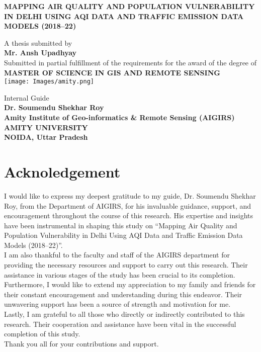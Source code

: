 \documentclass[12pt]{report}
\begin{document}
\begin{titlepage}
    \doublespacing
    \centering
    \vspace*{2cm}
    \large
    \textbf{\MakeUppercase{Mapping Air Quality and Population Vulnerability in Delhi Using AQI Data and Traffic Emission Data Models (2018–22)}}

    \Large
    A thesis submitted by\\[0.3cm]
    \textbf{Mr. Ansh Upadhyay}\\[1cm]

    Submitted in partial fulfillment of the requirements for the award of the degree of\\[0.3cm]
    \textbf{MASTER OF SCIENCE IN GIS AND REMOTE SENSING}\\[1cm]
    \texttt{[image: Images/amity.png]}

    Internal Guide\\
    \textbf{Dr. Soumendu Shekhar Roy}\\[0.5cm]
    \normalsize
    \textbf{Amity Institute of Geo-informatics \& Remote Sensing (AIGIRS)}\\
    \textbf{AMITY UNIVERSITY}\\
    \textbf{NOIDA, Uttar Pradesh}
\end{titlepage}
\restoregeometry

\onehalfspacing

\chapter*{Acknoledgement}
I would like to express my deepest gratitude to my guide, Dr. Soumendu Shekhar Roy, from the Department of AIGIRS, for his invaluable guidance, support, and encouragement throughout the course of this research. His expertise and insights have been instrumental in shaping this study on “Mapping Air Quality and Population Vulnerability in Delhi Using AQI Data and Traffic Emission Data Models (2018–22)”.\\
I am also thankful to the faculty and staff of the AIGIRS department for providing the necessary resources and support to carry out this research. Their assistance in various stages of the study has been crucial to its completion.\\
Furthermore, I would like to extend my appreciation to my family and friends for their constant encouragement and understanding during this endeavor. Their unwavering support has been a source of strength and motivation for me.\\
Lastly, I am grateful to all those who directly or indirectly contributed to this research. Their cooperation and assistance have been vital in the successful completion of this study.\\
Thank you all for your contributions and support.
\end{document}
